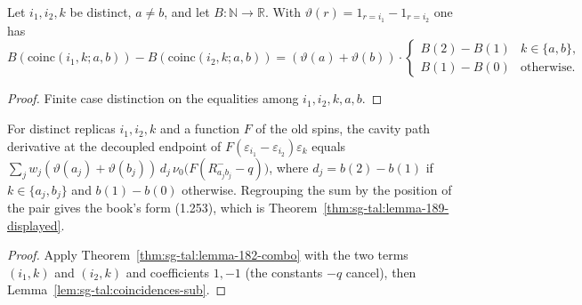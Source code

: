 \begin{lemma}
\label{lem:sg-tal:coincidences-sub}
  \leanok
{}
Let $i_1,i_2,k$ be distinct, $a\ne b$, and let $B:\mathbb N\to\mathbb R$.  With
$\vartheta(r)=1_{r=i_1}-1_{r=i_2}$ one has
$B(\mathrm{coinc}(i_1,k;a,b))-B(\mathrm{coinc}(i_2,k;a,b))=(\vartheta(a)+\vartheta(b))\cdot
\begin{cases}B(2)-B(1)&k\in\{a,b\},\\ B(1)-B(0)&\text{otherwise.}\end{cases}$
\end{lemma}
\begin{proof}
  \leanok
Finite case distinction on the equalities among $i_1,i_2,k,a,b$.
\end{proof}

\begin{theorem}
\label{thm:sg-tal:lemma-189}
  \leanok
{}
For distinct replicas $i_1,i_2,k$ and a function $F$ of the old spins, the cavity path derivative at
the decoupled endpoint of $F(\varepsilon_{i_1}-\varepsilon_{i_2})\varepsilon_k$ equals
$\sum_j w_j(\vartheta(a_j)+\vartheta(b_j))\,d_j\,\nu_0\bigl(F(R^-_{a_jb_j}-q)\bigr)$, where
$d_j=b(2)-b(1)$ if $k\in\{a_j,b_j\}$ and $b(1)-b(0)$ otherwise.  Regrouping the sum by the
position of the pair gives the book's form (1.253), which is Theorem~\ref{thm:sg-tal:lemma-189-displayed}.
\end{theorem}
\begin{proof}
  \leanok
Apply Theorem~\ref{thm:sg-tal:lemma-182-combo} with the two terms $(i_1,k)$ and $(i_2,k)$ and
coefficients $1,-1$ (the constants $-q$ cancel), then Lemma~\ref{lem:sg-tal:coincidences-sub}.
\end{proof}

